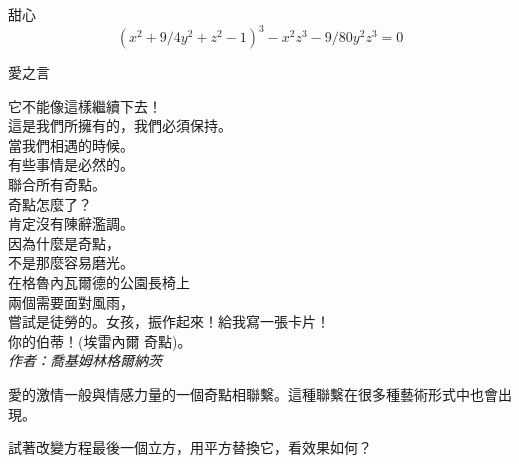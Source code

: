 \begin{surferPage}{甜心}
\[(x^2+ 9/4y^2	+ z^2- 1)^3- x^2z^3	- 9/80y^2z^3	= 0\]

\singlespacing
愛之言
\singlespacing

它不能像這樣繼續下去！\\
這是我們所擁有的，我們必須保持。\\
當我們相遇的時候。\\
有些事情是必然的。\\
聯合所有奇點。\\
奇點怎麼了？\\
肯定沒有陳辭濫調。\\
因為什麼是奇點，\\
不是那麼容易磨光。\\
在格魯內瓦爾德的公園長椅上\\
兩個需要面對風雨，\\
嘗試是徒勞的。女孩，振作起來！給我寫一張卡片！\\
你的伯蒂！(埃雷內爾 奇點)。\\
\textit{作者：喬基姆林格爾納茨}

\singlespacing
愛的激情一般與情感力量的一個奇點相聯繫。這種聯繫在很多種藝術形式中也會出現。

\singlespacing
試著改變方程最後一個立方，用平方替換它，看效果如何？
\end{surferPage}
